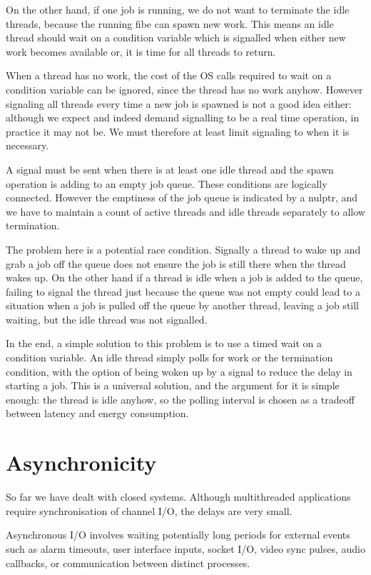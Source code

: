 \documentclass[oneside]{book}
\begin{document}
On the other hand, if one job is running, we do not want to terminate
the idle threads, because the running fibe can spawn new work.
This means an idle thread should wait on a condition variable which
is signalled when either new work becomes available or, it is time
for all threads to return.

When a thread has no work, the cost of the OS calls required to
wait on a condition variable can be ignored, since the thread
has no work anyhow. However signaling all threads every time
a new job is spawned is not a good idea either: although we expect
and indeed demand signalling to be a real time operation, in practice
it may not be. We must therefore at least limit signaling to when it
is necessary.

A signal must be sent when there is at least one idle thread and the 
spawn operation is adding to an empty job queue. These conditions
are logically connected. However the emptiness of the job queue
is indicated by a nulptr, and we have to maintain a count of 
active threads and idle threads separately to allow termination.

The problem here is a potential race condition. Signally a thread
to wake up and grab a job off the queue does not ensure the job
is still there when the thread wakes up. On the other hand if
a thread is idle when a job is added to the queue, failing to
signal the thread just because the queue was not empty could
lead to a situation when a job is pulled off the queue by another
thread, leaving a job still waiting, but the idle thread was
not signalled.

In the end, a simple solution to this problem is to use a timed wait
on a condition variable. An idle thread simply polls for work or the
termination condition, with the option of being woken up by a signal
to reduce the delay in starting a job. This is a universal solution,
and the argument for it is simple enough: the thread is idle anyhow,
so the polling interval is chosen as a tradeoff between latency and
energy consumption.

\section{Asynchronicity}
So far we have dealt with closed systems. Although multithreaded
applications require synchronisation of channel I/O, the delays
are very small.

Asynchronous I/O involves waiting potentially long periods for
external events such as alarm timeouts, user interface inputs,
socket I/O, video sync pulses, audio callbacks, or communication
between distinct processes.
\end{document}
